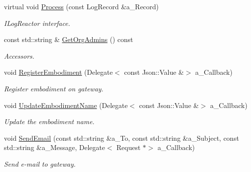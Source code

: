 \begin{DoxyCompactItemize}
\item 
\mbox{\label{class_robot_gateway_adce798117d5ca477acef6abb47a062b1}} 
virtual void \hyperlink{class_robot_gateway_adce798117d5ca477acef6abb47a062b1}{Process} (const Log\+Record \&a\+\_\+\+Record)
\begin{DoxyCompactList}\small\item\em I\+Log\+Reactor interface. \end{DoxyCompactList}\item 
\mbox{\label{class_robot_gateway_ab0887f20b112ca9be75a0a26b5804b59}} 
const std\+::string \& \hyperlink{class_robot_gateway_ab0887f20b112ca9be75a0a26b5804b59}{Get\+Org\+Admins} () const
\begin{DoxyCompactList}\small\item\em Accessors. \end{DoxyCompactList}\item 
\mbox{\label{class_robot_gateway_a6073bb6099a36ec29cbccd6ee246a8a4}} 
void \hyperlink{class_robot_gateway_a6073bb6099a36ec29cbccd6ee246a8a4}{Register\+Embodiment} (Delegate$<$ const Json\+::\+Value \&$>$ a\+\_\+\+Callback)
\begin{DoxyCompactList}\small\item\em Register embodiment on gateway. \end{DoxyCompactList}\item 
\mbox{\label{class_robot_gateway_a415e92bf9f9f936daf5157beeacba119}} 
void \hyperlink{class_robot_gateway_a415e92bf9f9f936daf5157beeacba119}{Update\+Embodiment\+Name} (Delegate$<$ const Json\+::\+Value \&$>$ a\+\_\+\+Callback)
\begin{DoxyCompactList}\small\item\em Update the embodiment name. \end{DoxyCompactList}\item 
\mbox{\label{class_robot_gateway_a744e9c566e643a9c5c4c80030be68548}} 
void \hyperlink{class_robot_gateway_a744e9c566e643a9c5c4c80030be68548}{Send\+Email} (const std\+::string \&a\+\_\+\+To, const std\+::string \&a\+\_\+\+Subject, const std\+::string \&a\+\_\+\+Message, Delegate$<$ Request $\ast$$>$ a\+\_\+\+Callback)
\begin{DoxyCompactList}\small\item\em Send e-\/mail to gateway. \end{DoxyCompactList}\item 
$$
\end{DoxyCompactItemize}
